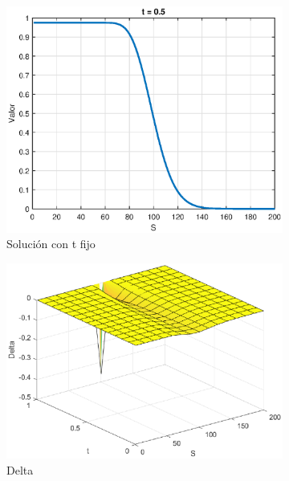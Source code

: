 \begin{figure}[H]
\begin{subfigure}[b]{0.35\linewidth}
    \end{subfigure}
    \begin{subfigure}[b]{0.35\linewidth}
        \includegraphics[width=\linewidth]{Imagenes/6_Sols/Binary_Put/BinaryPuttFIjo.eps}
        \caption{Solución con t fijo}
    \end{subfigure}
    \begin{subfigure}[b]{0.35\linewidth}
        \includegraphics[width=\linewidth]{Imagenes/6_Sols/Binary_Put/Binary_Put_Delta.eps}
        \caption{Delta}
    \end{subfigure}
    \begin{subfigure}[b]{0.35\linewidth}

\end{subfigure}
\end{figure}
